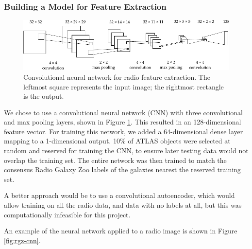     \subsubsection{Building a Model for Feature Extraction}
    \label{sec:feature-extraction-model}

      \begin{figure}
         \centering
         \includegraphics[width=\textwidth]{images/cnn_new.pdf}
         \caption{Convolutional neural network for radio feature extraction. The
           leftmost square represents the input image; the rightmost rectangle
           is the output.}
         \label{fig:radio-cnn}
       \end{figure}

      We chose to use a convolutional neural network (CNN) with three
      convolutional and max pooling layers, shown in Figure \ref{fig:radio-cnn}.
      This resulted in an 128-dimensional feature vector. For training this
      network, we added a 64-dimensional dense layer mapping to a 1-dimensional
      output. 10\% of ATLAS objects were selected at random and reserved for
      training the CNN, to ensure later testing data would not overlap the
      training set. The entire network was then trained to match the consensus
      Radio Galaxy Zoo labels of the galaxies nearest the reserved training set.

      A better approach would be to use a convolutional autoencoder, which would
      allow training on all the radio data, and data with no labels at all, but
      this was computationally infeasible for this project.

      An example of the neural network applied to a radio image is shown in
      Figure \ref{fig:rgz-cnn}.


